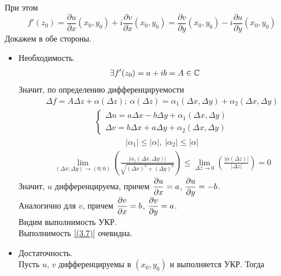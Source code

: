 При этом
\begin{equation}\label{(3.7)}
    f'(z_0) = \frac{\partial u}{\partial x}(x_0,y_0) + i\frac{\partial v}{\partial x}(x_0,y_0) = \frac{\partial v}{\partial y}(x_0,y_0) - i\frac{\partial u}{\partial y}(x_0,y_0)
\end{equation}
\pr
Докажем в обе стороны.
\begin{itemize}
    \item Необходимость.
    \begin{align*}
      & \exists f'(z_0) = a+ib = A \in \mathbb{C}
    \end{align*}
    Значит, по определению дифференцируемости
    \begin{align*}
      & \Delta f = A \Delta z + \alpha(\Delta z); \ \alpha(\Delta z) = \alpha_1(\Delta x, \Delta y) + \alpha_2(\Delta x, \Delta y)
    \end{align*}
    \begin{align*}
      & \left\{ \begin{matrix}
              \Delta u = a \Delta x - b \Delta y + \alpha_1(\Delta x, \Delta y) \\
              \Delta v = b \Delta x + a \Delta y + \alpha_2(\Delta x, \Delta y)
          \end{matrix} \right.
    \end{align*}
    \begin{align*}
      & \left| \alpha_1 \right| \leq \left| \alpha \right|, \ \left| \alpha_2 \right| \leq \left| \alpha \right|
    \end{align*}
    \begin{align*}
      & \lim_{(\Delta x; \Delta y) \to (0;0)}\left( \frac{\left| \alpha_1(\Delta x, \Delta y) \right|}{\sqrt{\left( \Delta x \right)^2 + \left( \Delta y \right)^2}} \right) \leq \lim_{\Delta z \to 0}\left( \frac{\left| \alpha(\Delta z) \right|}{\left| \Delta z \right|} \right) = 0
    \end{align*}
    Значит, $u$ дифференцируема, причем $\displaystyle \frac{\partial u}{\partial x} =
    a$, $\displaystyle \frac{\partial u}{\partial y} = -b$.
    \\
    Аналогично для $v$, причем $\displaystyle \frac{\partial v}{\partial x} = b$, $\displaystyle
    \frac{\partial v}{\partial y} = a$.
    \\
    Видим выполнимость УКР.
    \\
    Выполнимость \eqref{(3.7)} очевидна.
    \item Достаточность.
    \\
    Пусть $u$, $v$ дифференцируемы в $(x_0,y_0)$ и выполняется УКР. Тогда

\end{itemize}
